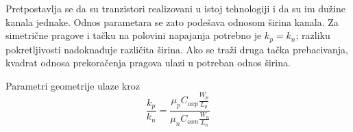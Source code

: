 Pretpostavlja se da su tranzistori realizovani u istoj tehnologiji i da su im dužine kanala jednake. Odnos parametara se zato podešava odnosom širina kanala. Za simetrične pragove i tačku na polovini napajanja potrebno je $k_p=k_n$; razliku pokretljivosti nadoknađuje različita širina. Ako se traži druga tačka prebacivanja, kvadrat odnosa prekoračenja pragova ulazi u potreban odnos širina.

Parametri geometrije ulaze kroz
\[\frac{k_p}{k_n}=\frac{\mu_pC_{oxp}\frac{W_p}{L_p}}{\mu_nC_{oxn}\frac{W_n}{L_n}}\]
